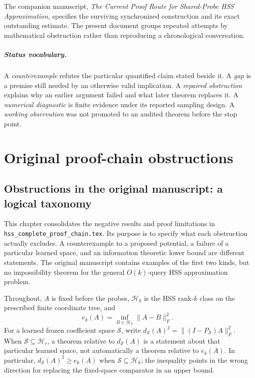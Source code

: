 \documentclass[11pt,oneside,openany,a4paper]{report}
\numberwithin{equation}{chapter}
\theoremstyle{definition}
\theoremstyle{remark}
\newcommand{\sourcefile}[1]{{\small\nolinkurl{#1}}}
\begin{document}
The companion manuscript, \emph{The Current Proof Route for Shared-Probe HSS Approximation}, specifies the surviving synchronized construction and its exact outstanding estimate. The present document groups repeated attempts by mathematical obstruction rather than reproducing a chronological conversation.

\paragraph{Status vocabulary.}
A \emph{counterexample} refutes the particular quantified claim stated beside it. A \emph{gap} is a premise still needed by an otherwise valid implication. A \emph{repaired obstruction} explains why an earlier argument failed and what later theorem replaces it. A \emph{numerical diagnostic} is finite evidence under its reported sampling design. A \emph{working observation} was not promoted to an audited theorem before the stop point.

\begingroup\small
\tableofcontents
\endgroup
\clearpage
{}
\chapter{Original proof-chain obstructions}

\section{Obstructions in the original manuscript: a logical taxonomy}
\label{origobs:taxonomy}

This chapter consolidates the negative results and proof limitations in
\sourcefile{hss_complete_proof_chain.tex}.  Its purpose is to specify what
each obstruction actually excludes.  A counterexample to a proposed
potential, a failure of a particular learned space, and an information
theoretic lower bound are different statements.  The original manuscript
contains examples of the first two kinds, but no impossibility theorem
for the general $O(k)$-query HSS approximation problem.

Throughout, $A$ is fixed before the probes, $\mathcal H_k$ is the HSS
rank-$k$ class on the prescribed finite coordinate tree, and
\[
 e_k(A)=\inf_{B\in\mathcal H_k}\|A-B\|_F^2.
\]
For a learned frozen coefficient space $\mathcal S$, write
$d_{\mathcal S}(A)^2=\|(I-P_{\mathcal S})A\|_F^2$.  When
$\mathcal S\subseteq\mathcal H_r$, a theorem relative to
$d_{\mathcal S}(A)$ is a statement about that particular learned space,
not automatically a theorem relative to $e_k(A)$.  In particular,
$d_{\mathcal S}(A)^2\ge e_k(A)$ when $\mathcal S\subseteq\mathcal H_k$;
the inequality points in the wrong direction for replacing the
fixed-space comparator in an upper bound.
\end{document}
